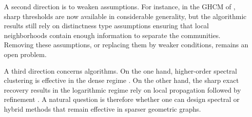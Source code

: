 \documentclass[runningheads]{llncs}
\begin{document}
A second direction is to weaken assumptions. For instance, in the GHCM of \citep{gaudio2026exact},  sharp thresholds are now available in considerable generality, but the algorithmic results still rely on distinctness type assumptions ensuring that local neighborhoods contain enough information to separate the communities. Removing these assumptions, or replacing them by weaker %
conditions, remains an open problem.

A third direction concerns algorithms. On the one hand, higher-order spectral clustering is effective in the dense regime \citep{avrachenkov2021higher,allem2025multicommunityspectralclusteringgeometric}. On the other hand, the sharp exact recovery results in the logarithmic regime rely on local propagation followed by refinement \citep{galhotra2023communityrecoverygeometricblock,abbe2021community,avrachenkov2026communitydetectionblockmodels,gaudio2026exact}. A natural question is therefore whether one can design spectral or hybrid methods that remain effective in sparser geometric graphs.




\end{document}
